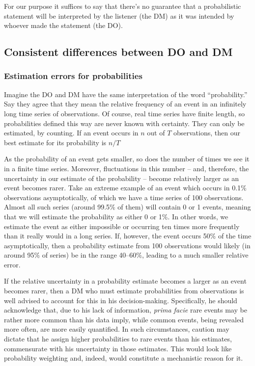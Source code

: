 \documentclass[a4paper, 12pt]{article}
\newcommand{\seclabel}[1]{\label{sec:#1}}
\begin{document}
For our purpose it suffices to say that there's no guarantee that a probabilistic statement will be interpreted by the listener (the DM) as it was intended by whoever made the statement (the DO).

\subsection{Consistent differences between DO and DM \seclabel{condition2}}

\subsubsection*{Estimation errors for probabilities}
Imagine the DO and DM have the same interpretation of the word ``probability.'' Say they agree that they mean the relative frequency of an event in an infinitely long time series of observations. Of course, real time series have finite length, so probabilities defined this way are never known with certainty. They can only be estimated, by counting. If an event occurs in $n$ out of $T$ observations, then our best estimate for its probability is $n/T$

As the probability of an event gets smaller, so does the number of times we see it in a finite time series. Moreover, fluctuations in this number -- and, therefore, the uncertainty in our estimate of the probability -- become relatively larger as an event becomes rarer. Take an extreme example of an event which occurs in 0.1\% observations asymptotically, of which we have a time series of 100 observations. Almost all such series (around 99.5\% of them) will contain 0 or 1 events, meaning that we will estimate the probability as either 0 or 1\%. In other words, we estimate the event as either impossible or occurring ten times more frequently than it really would in a long series. If, however, the event occurs 50\% of the time asymptotically, then a probability estimate from 100 observations would likely (in around 95\% of series) be in the range 40--60\%, leading to a much smaller relative error.

If the relative uncertainty in a probability estimate becomes a larger as an event becomes rarer, then a DM who must estimate probabilities from observations is well advised to account for this in his decision-making. Specifically, he should acknowledge that, due to his lack of information, {\it prima facie} rare events may be rather more common than his data imply, while common events, being revealed more often, are more easily quantified. In such circumstances, caution may dictate that he assign higher probabilities to rare events than his estimates, commensurate with his uncertainty in those estimates. This would look like probability weighting and, indeed, would constitute a mechanistic reason for it.
\end{document}
